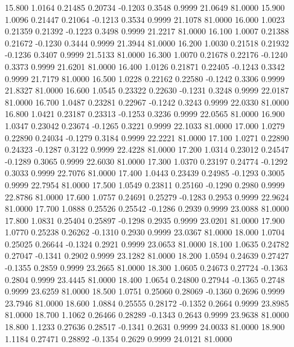   15.800   1.0164   0.21485   0.20734  -0.1203   0.3548   0.9999  21.0649  81.0000
  15.900   1.0096   0.21447   0.21064  -0.1213   0.3534   0.9999  21.1078  81.0000
  16.000   1.0023   0.21359   0.21392  -0.1223   0.3498   0.9999  21.2217  81.0000
  16.100   1.0007   0.21388   0.21672  -0.1230   0.3444   0.9999  21.3944  81.0000
  16.200   1.0030   0.21518   0.21932  -0.1236   0.3407   0.9999  21.5133  81.0000
  16.300   1.0070   0.21678   0.22176  -0.1240   0.3373   0.9999  21.6201  81.0000
  16.400   1.0126   0.21871   0.22405  -0.1243   0.3342   0.9999  21.7179  81.0000
  16.500   1.0228   0.22162   0.22580  -0.1242   0.3306   0.9999  21.8327  81.0000
  16.600   1.0545   0.23322   0.22630  -0.1231   0.3248   0.9999  22.0187  81.0000
  16.700   1.0487   0.23281   0.22967  -0.1242   0.3243   0.9999  22.0330  81.0000
  16.800   1.0421   0.23187   0.23313  -0.1253   0.3236   0.9999  22.0565  81.0000
  16.900   1.0347   0.23042   0.23674  -0.1265   0.3221   0.9999  22.1033  81.0000
  17.000   1.0279   0.22890   0.24034  -0.1279   0.3184   0.9999  22.2221  81.0000
  17.100   1.0271   0.22890   0.24323  -0.1287   0.3122   0.9999  22.4228  81.0000
  17.200   1.0314   0.23012   0.24547  -0.1289   0.3065   0.9999  22.6030  81.0000
  17.300   1.0370   0.23197   0.24774  -0.1292   0.3033   0.9999  22.7076  81.0000
  17.400   1.0443   0.23439   0.24985  -0.1293   0.3005   0.9999  22.7954  81.0000
  17.500   1.0549   0.23811   0.25160  -0.1290   0.2980   0.9999  22.8786  81.0000
  17.600   1.0757   0.24691   0.25279  -0.1283   0.2953   0.9999  22.9624  81.0000
  17.700   1.0888   0.25526   0.25542  -0.1286   0.2939   0.9999  23.0088  81.0000
  17.800   1.0831   0.25404   0.25897  -0.1298   0.2935   0.9999  23.0201  81.0000
  17.900   1.0770   0.25238   0.26262  -0.1310   0.2930   0.9999  23.0367  81.0000
  18.000   1.0704   0.25025   0.26644  -0.1324   0.2921   0.9999  23.0653  81.0000
  18.100   1.0635   0.24782   0.27047  -0.1341   0.2902   0.9999  23.1282  81.0000
  18.200   1.0594   0.24639   0.27427  -0.1355   0.2859   0.9999  23.2665  81.0000
  18.300   1.0605   0.24673   0.27724  -0.1363   0.2804   0.9999  23.4445  81.0000
  18.400   1.0654   0.24800   0.27944  -0.1365   0.2748   0.9999  23.6259  81.0000
  18.500   1.0751   0.25060   0.28069  -0.1360   0.2696   0.9999  23.7946  81.0000
  18.600   1.0884   0.25555   0.28172  -0.1352   0.2664   0.9999  23.8985  81.0000
  18.700   1.1062   0.26466   0.28289  -0.1343   0.2643   0.9999  23.9638  81.0000
  18.800   1.1233   0.27636   0.28517  -0.1341   0.2631   0.9999  24.0033  81.0000
  18.900   1.1184   0.27471   0.28892  -0.1354   0.2629   0.9999  24.0121  81.0000
